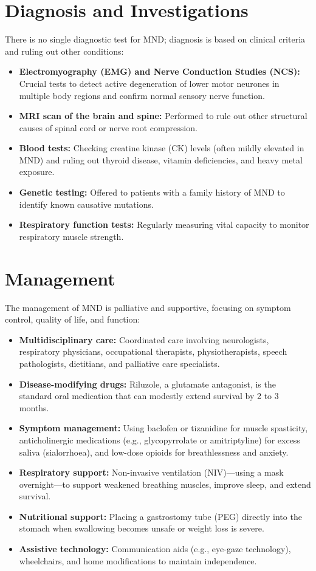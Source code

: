 \section*{Diagnosis and Investigations}
There is no single diagnostic test for MND; diagnosis is based on clinical criteria and ruling out other conditions:

\begin{itemize}
    \item \textbf{Electromyography (EMG) and Nerve Conduction Studies (NCS):} Crucial tests to detect active degeneration of lower motor neurones in multiple body regions and confirm normal sensory nerve function.
    \item \textbf{MRI scan of the brain and spine:} Performed to rule out other structural causes of spinal cord or nerve root compression.
    \item \textbf{Blood tests:} Checking creatine kinase (CK) levels (often mildly elevated in MND) and ruling out thyroid disease, vitamin deficiencies, and heavy metal exposure.
    \item \textbf{Genetic testing:} Offered to patients with a family history of MND to identify known causative mutations.
    \item \textbf{Respiratory function tests:} Regularly measuring vital capacity to monitor respiratory muscle strength.
\end{itemize}

\section*{Management}
The management of MND is palliative and supportive, focusing on symptom control, quality of life, and function:

\begin{itemize}
    \item \textbf{Multidisciplinary care:} Coordinated care involving neurologists, respiratory physicians, occupational therapists, physiotherapists, speech pathologists, dietitians, and palliative care specialists.
    \item \textbf{Disease-modifying drugs:} Riluzole, a glutamate antagonist, is the standard oral medication that can modestly extend survival by 2 to 3 months.
    \item \textbf{Symptom management:} Using baclofen or tizanidine for muscle spasticity, anticholinergic medications (e.g., glycopyrrolate or amitriptyline) for excess saliva (sialorrhoea), and low-dose opioids for breathlessness and anxiety.
    \item \textbf{Respiratory support:} Non-invasive ventilation (NIV)---using a mask overnight---to support weakened breathing muscles, improve sleep, and extend survival.
    \item \textbf{Nutritional support:} Placing a gastrostomy tube (PEG) directly into the stomach when swallowing becomes unsafe or weight loss is severe.
    \item \textbf{Assistive technology:} Communication aids (e.g., eye-gaze technology), wheelchairs, and home modifications to maintain independence.
\end{itemize}

